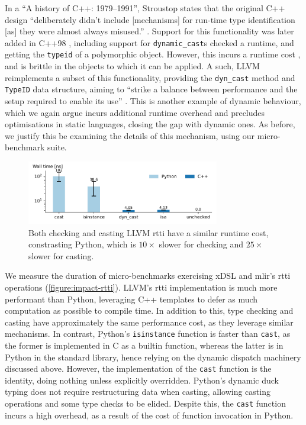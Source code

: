 In a ``A history of C++: 1979--1991'', Stroustop states that the original C++ design ``deliberately didn't include [mechanisms] for run-time type identification [as] they were almost always misused.'' \cite{stroustrupHistory197919911996}.
Support for this functionality was later added in C++98 \cite{internationalorganizationforstandardizationISOIEC148821998}, including support for \texttt{dynamic\_cast}s checked a runtime, and getting the \texttt{typeid} of a polymorphic object. However, this incurs a runtime cost \cite{goldthwaite2006technical}, and is brittle in the objects to which it can be applied. A such, LLVM reimplements a subset of this functionality, providing the \texttt{dyn\_cast} method and \texttt{TypeID} data structure, aiming to ``strike a balance between performance and the setup required to enable its use'' \cite{mlirteamMLIRCodeDocumentation}.
This is another example of dynamic behaviour, which we again argue incurs additional runtime overhead and precludes optimisations in static languages, closing the gap with dynamic ones.
As before, we justify this be examining the details of this mechanism, using our micro-benchmark suite.

\begin{figure}[H]
    \centering
    \includegraphics[width=0.75\textwidth]{images/impact_dynamism/dynamic_cast.pdf}
    \caption{Both checking and casting LLVM \ac{rtti} have a similar runtime cost, constrasting Python, which is $10\times$ slower for checking and $25\times$ slower for casting.}
    \label{figure:impact-rtti}
\end{figure}

We measure the duration of micro-benchmarks exercising xDSL and \ac{mlir}'s \ac{rtti} operations (\autoref{figure:impact-rtti}). LLVM's \ac{rtti} implementation is much more performant than Python, leveraging C++ templates to defer as much computation as possible to compile time. In addition to this, type checking and casting have approximately the same performance cost, as they leverage similar mechanisms.
In contrast, Python's \texttt{isinstance} function is faster than \texttt{cast}, as the former is implemented in C as a builtin function, whereas the latter is in Python in the standard library, hence relying on the dynamic dispatch machinery discussed above.
However, the implementation of the \texttt{cast} function is the identity, doing nothing unless explicitly overridden. Python's dynamic duck typing \cite{milojkovicItsDuckTyping2017} does not require restructuring data when casting, allowing casting operations and some type checks to be elided. Despite this, the \texttt{cast} function incurs a high overhead, as a result of the cost of function invocation in Python.





